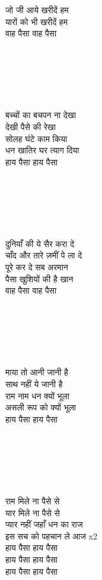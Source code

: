 {{{{{{{{{{{{जो जी आये खरीदें हम\\
यारों को भी खरीदें हम\\
वाह पैसा वाह पैसा\\
\\
\\
\\
\\
\\
\\
बच्चों का बचपन ना देखा\\
देखी पैसे की रेखा\\
सोलह घंटे काम किया\\
धन खातिर घर त्याग दिया\\
हाय पैसा हाय पैसा\\
\\
\\
\\
\\
\\
\\
दुनियाँ की ये सैर करा दे\\
चाँद और तारे ज़मीं पे ला दे\\
पूरे कर दे सब अरमान\\
पैसा खुशियों की है खान\\
वाह पैसा वाह पैसा\\
\\
\\
\\
\\
\\
\\
माया तो आनी जानी है\\
साथ नहीं ये जानी है\\
राम नाम धन क्यों भूला\\
असली रूप को क्यों भूला\\
हाय पैसा हाय पैसा\\
\\
\\
\\
\\
\\
\\
राम मिले ना पैसे से\\
यार मिले ना पैसे से\\
प्यार नहीं जहाँ धन का राज\\
इस सच को पहचान ले आज x2\\
हाय पैसा हाय पैसा\\
हाय पैसा हाय पैसा\\
हाय पैसा हाय पैसा\\
}}}}}}}}}}}}
